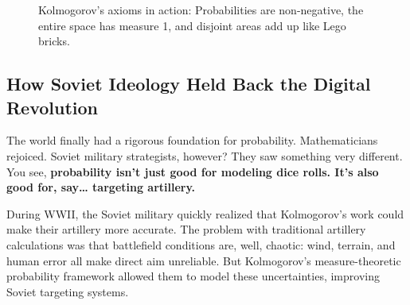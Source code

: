 \begin{figure}[H]
\centering
{}
\caption{Kolmogorov’s axioms in action: Probabilities are non-negative, the entire space has measure 1, and disjoint areas add up like Lego bricks.}
\end{figure}





\subsection{How Soviet Ideology Held Back the Digital Revolution}

The world finally had a rigorous foundation for probability. Mathematicians rejoiced. Soviet military strategists, however? They saw something very different.  You see, \textbf{probability isn’t just good for modeling dice rolls. It’s also good for, say… targeting artillery.}

During WWII, the Soviet military quickly realized that Kolmogorov’s work could make their artillery more accurate. The problem with traditional artillery calculations was that battlefield conditions are, well, chaotic: wind, terrain, and human error all make direct aim unreliable. But Kolmogorov’s measure-theoretic probability framework allowed them to model these uncertainties, improving Soviet targeting systems.  

